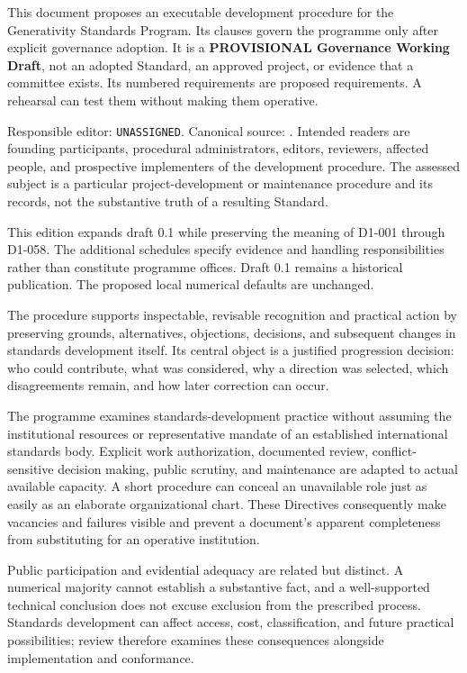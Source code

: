 \documentclass[11pt,a4paper]{article}
\begin{document}
\GSPfrontmatter
{}
This document proposes an executable development procedure for the Generativity Standards Program. Its clauses govern the programme only after explicit governance adoption. It is a \textbf{PROVISIONAL Governance Working Draft}, not an adopted Standard, an approved project, or evidence that a committee exists. Its numbered requirements are proposed requirements. A rehearsal can test them without making them operative.

Responsible editor: \texttt{UNASSIGNED}. Canonical source: . Intended readers are founding participants, procedural administrators, editors, reviewers, affected people, and prospective implementers of the development procedure. The assessed subject is a particular project-development or maintenance procedure and its records, not the substantive truth of a resulting Standard.

This edition expands draft 0.1 while preserving the meaning of D1-001 through D1-058. The additional schedules specify evidence and handling responsibilities rather than constitute programme offices. Draft 0.1 remains a historical publication. The proposed local numerical defaults are unchanged.

\tableofcontents\clearpage
{}
The procedure supports inspectable, revisable recognition and practical action by preserving grounds, alternatives, objections, decisions, and subsequent changes in standards development itself. Its central object is a justified progression decision: who could contribute, what was considered, why a direction was selected, which disagreements remain, and how later correction can occur.

The programme examines standards-development practice without assuming the institutional resources or representative mandate of an established international standards body. Explicit work authorization, documented review, conflict-sensitive decision making, public scrutiny, and maintenance are adapted to actual available capacity. A short procedure can conceal an unavailable role just as easily as an elaborate organizational chart. These Directives consequently make vacancies and failures visible and prevent a document's apparent completeness from substituting for an operative institution.

Public participation and evidential adequacy are related but distinct. A numerical majority cannot establish a substantive fact, and a well-supported technical conclusion does not excuse exclusion from the prescribed process. Standards development can affect access, cost, classification, and future practical possibilities; review therefore examines these consequences alongside implementation and conformance.
\end{document}
